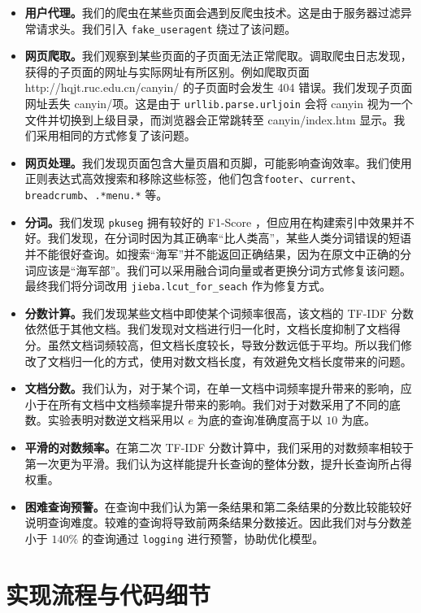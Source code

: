 \documentclass{ctexart}
\begin{document}
\begin{itemize}
    \item \textbf{用户代理。}我们的爬虫在某些页面会遇到反爬虫技术。这是由于服务器过滤异常请求头。我们引入 \verb|fake_useragent| 绕过了该问题。
    \item \textbf{网页爬取。}我们观察到某些页面的子页面无法正常爬取。调取爬虫日志发现，获得的子页面的网址与实际网址有所区别。例如爬取页面 http://hqjt.ruc.edu.cn/canyin/ 的子页面时会发生 404 错误。我们发现子页面网址丢失 canyin/项。这是由于 \verb|urllib.parse.urljoin| 会将 canyin 视为一个文件并切换到上级目录，而浏览器会正常跳转至 canyin/index.htm 显示。我们采用相同的方式修复了该问题。
    \item \textbf{网页处理。}我们发现页面包含大量页眉和页脚，可能影响查询效率。我们使用正则表达式高效搜索和移除这些标签，他们包含\verb|footer|、\verb|current|、\verb|breadcrumb|、\verb|.*menu.*| 等。
    \item \textbf{分词。}我们发现 \verb|pkuseg| 拥有较好的 F1-Score ，但应用在构建索引中效果并不好。我们发现，在分词时因为其正确率“比人类高”，某些人类分词错误的短语并不能很好查询。如搜索“海军”并不能返回正确结果，因为在原文中正确的分词应该是“海军部”。我们可以采用融合词向量或者更换分词方式修复该问题。最终我们将分词改用 \verb|jieba.lcut_for_seach| 作为修复方式。
    \item \textbf{分数计算。}我们发现某些文档中即使某个词频率很高，该文档的 TF-IDF 分数依然低于其他文档。我们发现对文档进行归一化时，文档长度抑制了文档得分。虽然文档词频较高，但文档长度较长，导致分数远低于平均。所以我们修改了文档归一化的方式，使用对数文档长度，有效避免文档长度带来的问题。
    \item \textbf{文档分数。}我们认为，对于某个词，在单一文档中词频率提升带来的影响，应小于在所有文档中文档频率提升带来的影响。我们对于对数采用了不同的底数。实验表明对数逆文档采用以 $e$ 为底的查询准确度高于以 $10$ 为底。
    \item \textbf{平滑的对数频率。}在第二次 TF-IDF 分数计算中，我们采用的对数频率相较于第一次更为平滑。我们认为这样能提升长查询的整体分数，提升长查询所占得权重。
    \item \textbf{困难查询预警。}在查询中我们认为第一条结果和第二条结果的分数比较能较好说明查询难度。较难的查询将导致前两条结果分数接近。因此我们对与分数差小于 $140\%$ 的查询通过 \verb|logging| 进行预警，协助优化模型。
\end{itemize}



\section{实现流程与代码细节}
\end{document}
